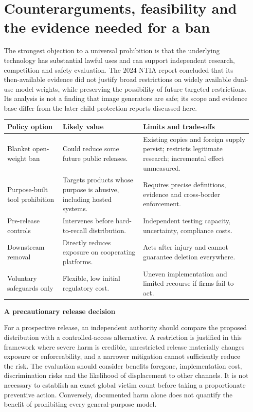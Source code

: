 \documentclass[10pt,a4paper]{article}
\newcommand{\sub}[1]{\vspace{1mm}\textbf{#1}\par}
\begin{document}
\section{Counterarguments, feasibility and the evidence needed for a ban}
The strongest objection to a universal prohibition is that the underlying technology has substantial lawful uses and can support independent research, competition and safety evaluation. The 2024 NTIA report concluded that its then-available evidence did not justify broad restrictions on widely available dual-use model weights, while preserving the possibility of future targeted restrictions. Its analysis is not a finding that image generators are safe; its scope and evidence base differ from the later child-protection reports discussed here. \cite{ntia}

\begin{center}\small\begin{tabularx}{\linewidth}{@{}YYY@{}}\toprule
\textbf{Policy option} & \textbf{Likely value} & \textbf{Limits and trade-offs}\\\midrule
Blanket open-weight ban & Could reduce some future public releases. & Existing copies and foreign supply persist; restricts legitimate research; incremental effect unmeasured.\\
Purpose-built tool prohibition & Targets products whose purpose is abusive, including hosted systems. & Requires precise definitions, evidence and cross-border enforcement.\\
Pre-release controls & Intervenes before hard-to-recall distribution. & Independent testing capacity, uncertainty, compliance costs.\\
Downstream removal & Directly reduces exposure on cooperating platforms. & Acts after injury and cannot guarantee deletion everywhere.\\
Voluntary safeguards only & Flexible, low initial regulatory cost. & Uneven implementation and limited recourse if firms fail to act.\\\bottomrule\end{tabularx}\end{center}

\sub{A precautionary release decision}
For a prospective release, an independent authority should compare the proposed distribution with a controlled-access alternative. A restriction is justified in this framework where severe harm is credible, unrestricted release materially changes exposure or enforceability, and a narrower mitigation cannot sufficiently reduce the risk. The evaluation should consider benefits foregone, implementation cost, discrimination risks and the likelihood of displacement to other channels. It is not necessary to establish an exact global victim count before taking a proportionate preventive action. Conversely, documented harm alone does not quantify the benefit of prohibiting every general-purpose model.
\end{document}
